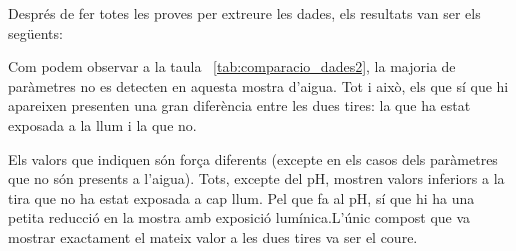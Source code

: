 Després de fer totes les proves per extreure les dades, els resultats van ser els següents:
\begin{table}[H]
\centering
{}
\caption{Resultats del primer experiment 2}

\label{tab:comparacio_dades2}
\end{table}

Com podem observar a la taula~ \ref{tab:comparacio_dades2}, la majoria de paràmetres no es detecten en aquesta mostra d’aigua. Tot i això, els que sí que hi apareixen presenten una gran diferència entre les dues tires: la que ha estat exposada a la llum i la que no.

Els valors que indiquen són força diferents (excepte en els casos dels paràmetres que no són presents a l’aigua). Tots, excepte del pH, mostren valors inferiors a la tira que no ha estat exposada a cap llum. Pel que fa al pH, sí que hi ha una petita reducció en la mostra amb exposició lumínica.L’únic compost que va mostrar exactament el mateix valor a les dues tires va ser el coure.

